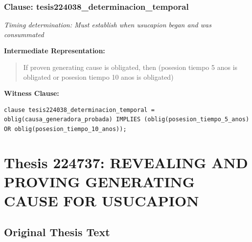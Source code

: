 \documentclass[11pt,a4paper]{article}
\begin{document}
\subsubsection{Clause: tesis224038\_determinacion\_temporal}

\textit{Timing determination: Must establish when usucapion began and was consummated}

\textbf{Intermediate Representation:}

\begin{quote}
If proven generating cause is obligated, then (posesion tiempo 5 anos is obligated or posesion tiempo 10 anos is obligated)
\end{quote}

\textbf{Witness Clause:}

\begin{lstlisting}[style=witnessstyle, language=Witness]
clause tesis224038_determinacion_temporal = oblig(causa_generadora_probada) IMPLIES (oblig(posesion_tiempo_5_anos) OR oblig(posesion_tiempo_10_anos));
\end{lstlisting}

\newpage

\section{Thesis 224737: REVEALING AND PROVING GENERATING CAUSE FOR USUCAPION}
\label{thesis:224737}

\subsection{Original Thesis Text}
\end{document}
